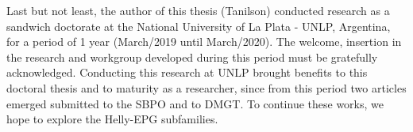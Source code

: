 Last but not least, the author of this thesis (Tanilson) conducted research as a sandwich doctorate at the National University of La Plata - UNLP, Argentina, for a period of 1 year (March/2019 until March/2020). The welcome, insertion in the research and workgroup developed during this period must be gratefully acknowledged. Conducting this research at UNLP brought benefits to this doctoral thesis and to maturity as a researcher, since from this period two articles emerged submitted to the SBPO and to DMGT. To continue these works, we hope to explore the Helly-EPG subfamilies.






